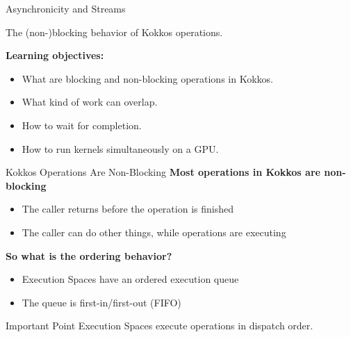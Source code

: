 

\begin{frame}[fragile]

  {\Huge Asynchronicity and Streams}

  \vspace{10pt}

	{\large The (non-)blocking behavior of Kokkos operations.}

  \vspace{20pt}

  \textbf{Learning objectives:}
  \begin{itemize}
    \item {What are blocking and non-blocking operations in Kokkos.}
    \item {What kind of work can overlap.}
    \item {How to wait for completion.}
    \item {How to run kernels simultaneously on a GPU.}
  \end{itemize}

  \vspace{-20pt}

\end{frame}


\begin{frame}[fragile]{Kokkos Operations Are Non-Blocking}
\textbf{Most operations in Kokkos are non-blocking}

\begin{itemize}
  \item{The caller returns before the operation is finished}
  \item{The caller can do other things, while operations are executing}
\end{itemize}

\pause

\textbf{So what is the ordering behavior?}

\begin{itemize}
  \item{Execution Spaces have an ordered execution queue}
  \item{The queue is first-in/first-out (FIFO)}
\end{itemize}

\pause
\begin{block}{Important Point}
  Execution Spaces execute operations in dispatch order.
\end{block}

\end{frame}

